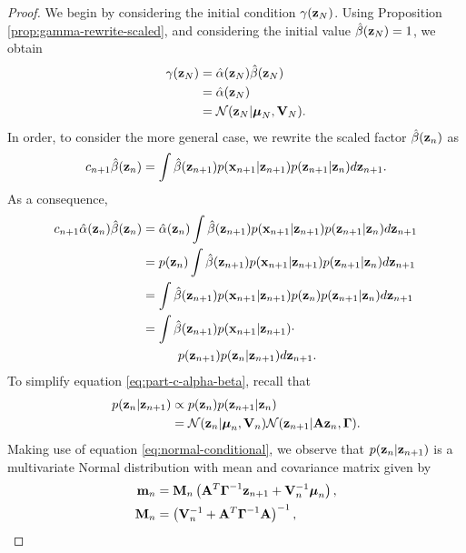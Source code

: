 \documentclass[12pt, oneside]{book}
\numberwithin{equation}{section}
\newcommand{\x}{{\bf x}}
\newcommand{\z}{{\bf z}}
\newcommand{\N}{\mathcal{N}}
\begin{document}
{\begin{proof}
	We begin by considering the initial condition $\gamma(\z_N)$. Using Proposition \ref{prop:gamma-rewrite-scaled}, and considering the initial value $\hat\beta(\z_N)=1$, we obtain
	\begin{align}
		\gamma(\z_N) &= \hat\alpha(\z_N)\hat\beta(\z_N)\\
					 &= \hat\alpha(\z_N)\\
					 &= \N(\z_N \vert \boldsymbol\mu_N, {\bf V}_N).
	\end{align}
	In order, to consider the more general case, we rewrite the scaled factor $\hat\beta(\z_n)$ as
	\begin{equation}
		c_{n+1} \hat\beta(\z_n) = \int \hat\beta(\z_{n+1}) p(\x_{n+1} \vert \z_{n+1}) p(\z_{n+1} \vert \z_n) d\z_{n+1}.
	\end{equation}
	As a consequence,	
	\begin{align}
		c_{n+1}\hat\alpha(\z_n)\hat\beta(\z_n) &= \hat\alpha(\z_n) \int \hat\beta(\z_{n+1}) p(\x_{n+1} \vert \z_{n+1}) p(\z_{n+1} \vert \z_n) d\z_{n+1}\\
		&= p(\z_n)\int \hat\beta(\z_{n+1}) p(\x_{n+1}\vert \z_{n+1})p(\z_{n+1}\vert \z_n) d\z_{n+1}\\
		&= \int \hat\beta(\z_{n+1}) p(\x_{n+1}\vert \z_{n+1}) p(\z_n) p(\z_{n+1}\vert \z_n) d\z_{n+1}\\
		&= \int \hat\beta(\z_{n+1 }) p(\x_{n+1}\vert \z_{n+1}) \cdot \nonumber\\
		&\hspace{1cm} p(\z_{n+1}) p(\z_{n}\vert \z_{n+1}) d\z_{n+1}. \label{eq:part-c-alpha-beta}
	\end{align}
	To simplify equation \eqref{eq:part-c-alpha-beta}, recall that
	\begin{align}
		p(\z_n\vert \z_{n+1}) &\propto p(\z_n) p(\z_{n+1} \vert \z_n) \\
		&= \N(\z_n \vert\boldsymbol\mu_n, {\bf V}_n) \N(\z_{n+1} \vert {\bf A}\z_n, \boldsymbol\Gamma).
	\end{align}
	Making use of equation \eqref{eq:normal-conditional}, we observe that $p(\z_n \vert \z_{n+1})$ is a multivariate Normal distribution with mean and covariance matrix given by
	\begin{align}
		{\bf m}_n &= {\bf M}_n \left({\bf A}^T\boldsymbol\Gamma^{-1}\z_{n+1} + {\bf V}_n^{-1}\boldsymbol\mu_n\right),\\
		{\bf M}_n &= \left( {\bf V}_n^{-1}  + {\bf A}^T\boldsymbol{\Gamma}^{-1}{\bf A} \right)^{-1},
	\end{align}	

\end{proof}}
\end{document}
